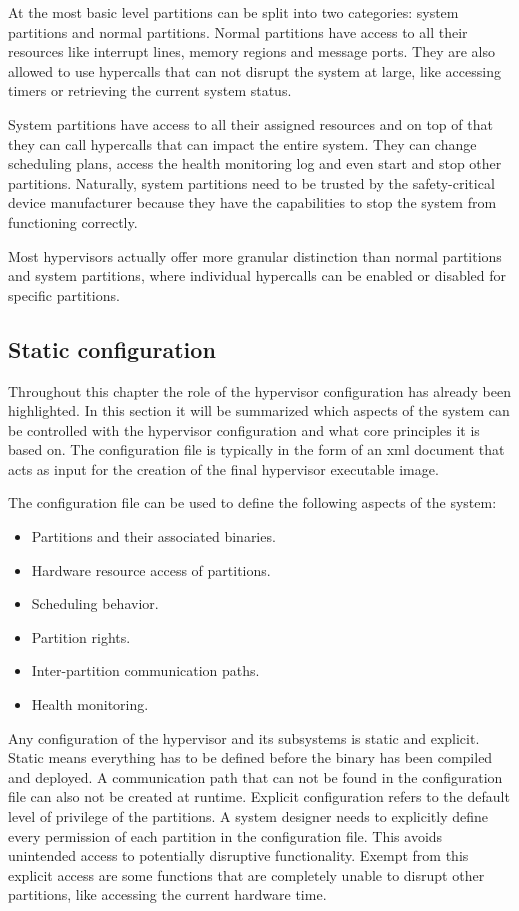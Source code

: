 At the most basic level partitions can be split into two categories: system partitions and normal partitions. Normal partitions have access to all their resources like interrupt lines, memory regions and message ports. They are also allowed to use hypercalls that can not disrupt the system at large, like accessing timers or retrieving the current system status.

System partitions have access to all their assigned resources and on top of that they can call hypercalls that can impact the entire system. They can change scheduling plans, access the health monitoring log and even start and stop other partitions. Naturally, system partitions need to be trusted by the safety-critical device manufacturer because they have the capabilities to stop the system from functioning correctly.

Most hypervisors actually offer more granular distinction than normal partitions and system partitions, where individual hypercalls can be enabled or disabled for specific partitions.
\subsection{Static configuration}
Throughout this chapter the role of the hypervisor configuration has already been highlighted. In this section it will be summarized which aspects of the system can be controlled with the hypervisor configuration and what core principles it is based on. The configuration file is typically in the form of an \acrshort{xml} document that acts as input for the creation of the final hypervisor executable image.

The configuration file can be used to define the following aspects of the system:
\begin{itemize}
    \item Partitions and their associated binaries.
    \item Hardware resource access of partitions.
    \item Scheduling behavior.
    \item Partition rights.
    \item Inter-partition communication paths.
    \item Health monitoring.
\end{itemize}

Any configuration of the hypervisor and its subsystems is static and explicit. Static means everything has to be defined before the binary has been compiled and deployed. A communication path that can not be found in the configuration file can also not be created at runtime. Explicit configuration refers to the default level of privilege of the partitions. A system designer needs to explicitly define every permission of each partition in the configuration file. This avoids unintended access to potentially disruptive functionality. Exempt from this explicit access are some functions that are completely unable to disrupt other partitions, like accessing the current hardware time.

